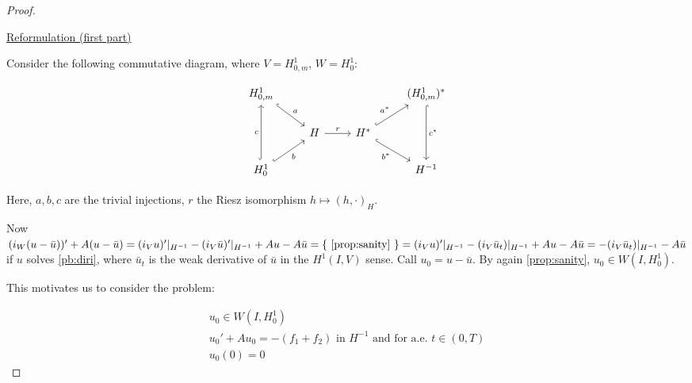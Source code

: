 \documentclass[english,a4paper,9pt,oneside]{scrbook}	%
\theoremstyle{break}
\newenvironment{mproof}[1][\proofname]{%
  \begin{proof}[#1]$ $\par\nobreak\ignorespaces
}{%
  \end{proof}
}
\renewcommand*{\proofname}{Proof}
\theoremstyle{remark}
\newcommand{\tr}{\text{tr}}
\newcommand{\ind}[1]{\{\text{ #1 }\}}
\begin{document}
\begin{appendices}
\begin{mproof}
\underline{Reformulation (first part)}

Consider the following commutative diagram, where $V = H^1_{0,m}$, $W=H^1_0$:

\[\begin{tikzcd}
	{H^1_{0,m}} &&& {(H^1_{0,m})^*} \\
	& H & {H^*} \\
	{H^1_0} &&& {H^{-1}}
	\arrow["c", hook, from=3-1, to=1-1]
	\arrow["a", hook, from=1-1, to=2-2]
	\arrow["b"', hook, from=3-1, to=2-2]
	\arrow["{a^*}", hook, from=2-3, to=1-4]
	\arrow["r", from=2-2, to=2-3]
	\arrow["{b^*}"', hook, from=2-3, to=3-4]
	\arrow["{c^*}", hook, from=1-4, to=3-4]
\end{tikzcd}\]

Here, $a,b,c$ are the trivial injections, $r$ the Riesz isomorphism $h\mapsto(h,\cdot)_H$. 

Now $(i_W (u-\bar{u}) )'+A(u - \bar{u}) = (i_Vu)'|_{H^{-1}}-(i_V\bar{u})'|_{H^{-1}}+Au - A\bar{u} = \ind{\cref{prop:sanity}}  = (i_Vu)'|_{H^{-1}}-(i_V\bar{u}_t)|_{H^{-1}}+Au - A\bar{u} = -(i_V\bar{u}_t)|_{H^{-1}}- A\bar{u}$ if $u$ solves \cref{pb:diri}, where $\bar{u}_t$ is the weak derivative of $\bar{u}$ in the $H^1(I,V)$ sense. Call $u_0 = u-\bar{u}$. By again \cref{prop:sanity}, $u_0 \in W(I,H^1_0)$.

%
%

This motivates us to consider the problem: 

\begin{align}
u_0 \in W(I,H^1_0) \\
u_0' + A u_0 = -(f_1+f_2) \text{ in }H^{-1} \text{ and for a.e. } t \in (0,T) \\
u_0(0)=0
\end{align}


\end{mproof}
\end{appendices}
\end{document}
